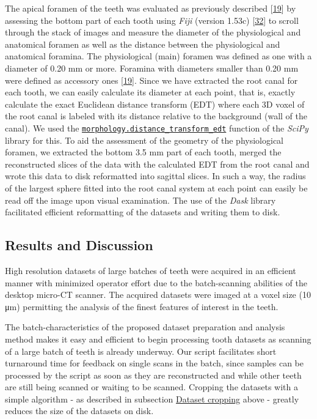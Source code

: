 \documentclass[
  american,
]{article}
\begin{document}
The apical foramen of the teeth was evaluated as previously described {[}\protect\hyperlink{ref-1Gn1pVZXt}{19}{]} by assessing the bottom part of each tooth using \emph{Fiji} (version 1.53c) {[}\protect\hyperlink{ref-Fkmz2cmo}{32}{]} to scroll through the stack of images and measure the diameter of the physiological and anatomical foramen as well as the distance between the physiological and anatomical foramina.
The physiological (main) foramen was defined as one with a diameter of 0.20 mm or more.
Foramina with diameters smaller than 0.20 mm were defined as accessory ones {[}\protect\hyperlink{ref-1Gn1pVZXt}{19}{]}.
Since we have extracted the root canal for each tooth, we can easily calculate its diameter at each point, that is, exactly calculate the exact Euclidean distance transform (EDT) where each 3D voxel of the root canal is labeled with its distance relative to the background (wall of the canal).
We used the \href{https://docs.scipy.org/doc/scipy-0.14.0/reference/generated/scipy.ndimage.morphology.distance_transform_edt.html}{\texttt{morphology.distance\_transform\_edt}} function of the \emph{SciPy} library for this.
To aid the assessment of the geometry of the physiological foramen, we extracted the bottom 3.5 mm part of each tooth, merged the reconstructed slices of the data with the calculated EDT from the root canal and wrote this data to disk reformatted into sagittal
slices.
In such a way, the radius of the largest sphere fitted into the root canal system at each point can easily be read off the image upon visual examination.
The use of the \emph{Dask} library facilitated efficient reformatting of the datasets and writing them to disk.

\hypertarget{results-and-discussion}{%
\subsection{Results and Discussion}\label{results-and-discussion}}

High resolution datasets of large batches of teeth were acquired in an efficient manner with minimized operator effort due to the batch-scanning abilities of the desktop micro-CT scanner.
The acquired datasets were imaged at a voxel size (10 μm) permitting the analysis of the finest features of interest in the teeth.

The batch-characteristics of the proposed dataset preparation and analysis method makes it easy and efficient to begin processing tooth datasets as scanning of a large batch of teeth is already underway.
Our script facilitates short turnaround time for feedback on single scans in the batch, since samples can be processed by the script as soon as they are reconstructed and while other teeth are still being scanned or waiting to be scanned.
Cropping the datasets with a simple algorithm - as described in subsection \protect\hyperlink{dataset-cropping}{Dataset cropping} above - greatly reduces the size of the datasets on disk.
\end{document}

